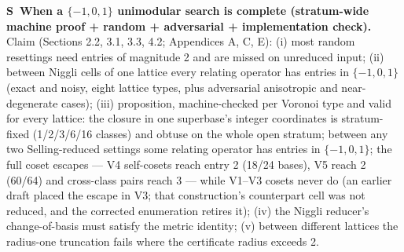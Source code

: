\documentclass[11pt]{article}
\newcounter{scheck}
\renewcommand{\thescheck}{S\arabic{scheck}}
\newcommand{\sitem}[2]{\medskip\noindent\refstepcounter{scheck}\label{#1}\textbf{\thescheck\ #2.}\ }
\begin{document}
\sitem{z:brute-complete}{When a $\{-1,0,1\}$ unimodular search is complete (stratum-wide machine proof + random + adversarial + implementation check)}
Claim (Sections 2.2, 3.1, 3.3, 4.2; Appendices A, C, E): (i) most random resettings need entries of magnitude 2 and are missed on unreduced input; (ii) between Niggli cells of one lattice every relating operator has entries in $\{-1,0,1\}$ (exact and noisy, eight lattice types, plus adversarial anisotropic and near-degenerate cases); (iii) proposition, machine-checked per Voronoi type and valid for every lattice: the closure in one superbase's integer coordinates is stratum-fixed (1/2/3/6/16 classes) and obtuse on the whole open stratum; between any two Selling-reduced settings some relating operator has entries in $\{-1,0,1\}$; the full coset escapes --- V4 self-cosets reach entry 2 (18/24 bases), V5 reach 2 (60/64) and cross-class pairs reach 3 --- while V1--V3 cosets never do (an earlier draft placed the escape in V3; that construction's counterpart cell was not reduced, and the corrected enumeration retires it); (iv) the Niggli reducer's change-of-basis must satisfy the metric identity; (v) between different lattices the radius-one truncation fails where the certificate radius exceeds 2.
\end{document}
